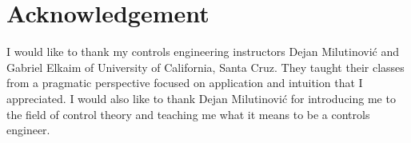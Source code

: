\documentclass[10pt,conference,compsoc]{IEEEtran}
\begin{document}
\section*{Acknowledgement}

\noindent I would like to thank my controls engineering instructors Dejan
Milutinovi\'c and Gabriel Elkaim of University of California, Santa Cruz. They
taught their classes from a pragmatic perspective focused on application and
intuition that I appreciated. I would also like to thank Dejan Milutinovi\'c for
introducing me to the field of control theory and teaching me what it means to
be a controls engineer.



\glsaddall
\printglossaries
\end{document}
